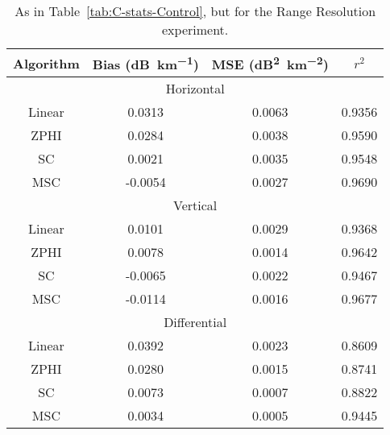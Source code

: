\begin{table}
    \centering
    \begin{tabular}{| c | c | c | c |}
        \hline
        Algorithm & Bias (\si{dB\per \kilo\meter}) & MSE (\si{dB\squared \per \kilo\meter \squared}) & $r^2$ \\
        \hline
        \hline
        \multicolumn{4}{|c|}{Horizontal}\\
        \hline
        Linear & 0.0313 & 0.0063 & 0.9356\\
        ZPHI & 0.0284 & 0.0038 & 0.9590\\
        SC & 0.0021 & 0.0035 & 0.9548\\
        MSC & -0.0054 & 0.0027 & 0.9690\\
        \hline
        \multicolumn{4}{|c|}{Vertical}\\
        \hline
        Linear & 0.0101 & 0.0029 & 0.9368\\
        ZPHI & 0.0078 & 0.0014 & 0.9642\\
        SC & -0.0065 & 0.0022 & 0.9467\\
        MSC & -0.0114 & 0.0016 & 0.9677\\
        \hline
        \multicolumn{4}{|c|}{Differential}\\
        \hline
        Linear & 0.0392 & 0.0023 & 0.8609\\
        ZPHI & 0.0280 & 0.0015 & 0.8741\\
        SC & 0.0073 & 0.0007 & 0.8822\\
        MSC & 0.0034 & 0.0005 & 0.9445\\
\hline
    \end{tabular}
    \caption{As in Table~\ref{tab:C-stats-Control}, but for
    the Range Resolution experiment.}
    \label{tab:C-stats-Range Resolution}
\end{table}
